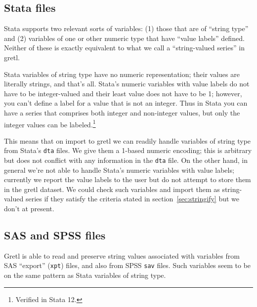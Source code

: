 \subsection{Stata files}

Stata supports two relevant sorts of variables: (1) those that are of
``string type'' and (2) variables of one or other numeric type that
have ``value labels'' defined. Neither of these is exactly equivalent
to what we call a ``string-valued series'' in gretl.

Stata variables of string type have no numeric representation; their
values are literally strings, and that's all. Stata's numeric
variables with value labels do not have to be integer-valued and their
least value does not have to be 1; however, you can't define a label
for a value that is not an integer. Thus in Stata you can have a
series that comprises both integer and non-integer values, but only
the integer values can be labeled.\footnote{Verified in Stata 12.}

This means that on import to gretl we can readily handle variables of
string type from Stata's \texttt{dta} files. We give them a 1-based
numeric encoding; this is arbitrary but does not conflict with any
information in the \texttt{dta} file. On the other hand, in general
we're not able to handle Stata's numeric variables with value labels;
currently we report the value labels to the user but do not attempt to
store them in the gretl dataset. We could check such variables and
import them as string-valued series if they satisfy the criteria
stated in section~\ref{sec:stringify} but we don't at present.

\subsection{SAS and SPSS files}

Gretl is able to read and preserve string values associated with
variables from SAS ``export'' (\texttt{xpt}) files, and also from SPSS
\texttt{sav} files. Such variables seem to be on the same pattern as
Stata variables of string type.


